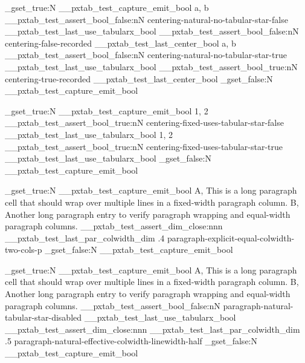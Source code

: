 \documentclass{article}
\begin{document}
\bool_gset_true:N \g__pxtab_test_capture_emit_bool
  {a, b}
\__pxtab_test_assert_bool_false:nN
  { centering-natural-no-tabular-star-false }
  \g__pxtab_test_last_use_tabularx_bool
\__pxtab_test_assert_bool_false:nN
  { centering-false-recorded }
  \g__pxtab_test_last_center_bool
  {a, b}
\__pxtab_test_assert_bool_false:nN
  { centering-natural-no-tabular-star-true }
  \g__pxtab_test_last_use_tabularx_bool
\__pxtab_test_assert_bool_true:nN
  { centering-true-recorded }
  \g__pxtab_test_last_center_bool
\bool_gset_false:N \g__pxtab_test_capture_emit_bool

\bool_gset_true:N \g__pxtab_test_capture_emit_bool
  {1, 2}
\__pxtab_test_assert_bool_true:nN
  { centering-fixed-uses-tabular-star-false }
  \g__pxtab_test_last_use_tabularx_bool
  {1, 2}
\__pxtab_test_assert_bool_true:nN
  { centering-fixed-uses-tabular-star-true }
  \g__pxtab_test_last_use_tabularx_bool
\bool_gset_false:N \g__pxtab_test_capture_emit_bool

\bool_gset_true:N \g__pxtab_test_capture_emit_bool
  {A, This is a long paragraph cell that should wrap over multiple lines in a fixed-width paragraph column.}
  {B, Another long paragraph entry to verify paragraph wrapping and equal-width paragraph columns.}
\__pxtab_test_assert_dim_close:nnn
  { \g__pxtab_test_last_par_colwidth_dim }
  { .4\linewidth }
  { paragraph-explicit-equal-colwidth-two-cols-p }
\bool_gset_false:N \g__pxtab_test_capture_emit_bool

\bool_gset_true:N \g__pxtab_test_capture_emit_bool
  {A, This is a long paragraph cell that should wrap over multiple lines in a fixed-width paragraph column.}
  {B, Another long paragraph entry to verify paragraph wrapping and equal-width paragraph columns.}
\__pxtab_test_assert_bool_false:nN
  { paragraph-natural-tabular-star-disabled }
  \g__pxtab_test_last_use_tabularx_bool
\__pxtab_test_assert_dim_close:nnn
  { \g__pxtab_test_last_par_colwidth_dim }
  { .5\linewidth }
  { paragraph-natural-effective-colwidth-linewidth-half }
\bool_gset_false:N \g__pxtab_test_capture_emit_bool
\end{document}
